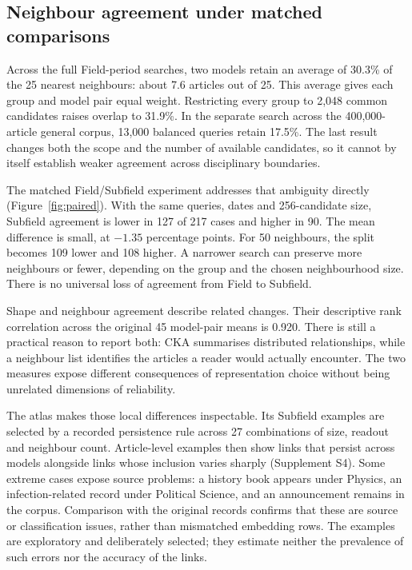 \documentclass[12pt]{article}
\begin{document}
\subsection{Neighbour agreement under matched comparisons}
Across the full Field-period searches, two models retain an average of 30.3\% of the 25 nearest neighbours: about 7.6 articles out of 25. This average gives each group and model pair equal weight. Restricting every group to 2,048 common candidates raises overlap to 31.9\%. In the separate search across the 400,000-article general corpus, 13,000 balanced queries retain 17.5\%. The last result changes both the scope and the number of available candidates, so it cannot by itself establish weaker agreement across disciplinary boundaries.

The matched Field/Subfield experiment addresses that ambiguity directly (Figure~\ref{fig:paired}). With the same queries, dates and 256-candidate size, Subfield agreement is lower in 127 of 217 cases and higher in 90. The mean difference is small, at $-1.35$ percentage points. For 50 neighbours, the split becomes 109 lower and 108 higher. A narrower search can preserve more neighbours or fewer, depending on the group and the chosen neighbourhood size. There is no universal loss of agreement from Field to Subfield.

Shape and neighbour agreement describe related changes. Their descriptive rank correlation across the original 45 model-pair means is 0.920. There is still a practical reason to report both: CKA summarises distributed relationships, while a neighbour list identifies the articles a reader would actually encounter. The two measures expose different consequences of representation choice without being unrelated dimensions of reliability.

The atlas makes those local differences inspectable. Its Subfield examples are selected by a recorded persistence rule across 27 combinations of size, readout and neighbour count. Article-level examples then show links that persist across models alongside links whose inclusion varies sharply (Supplement S4). Some extreme cases expose source problems: a history book appears under Physics, an infection-related record under Political Science, and an announcement remains in the corpus. Comparison with the original records confirms that these are source or classification issues, rather than mismatched embedding rows. The examples are exploratory and deliberately selected; they estimate neither the prevalence of such errors nor the accuracy of the links.
\end{document}
